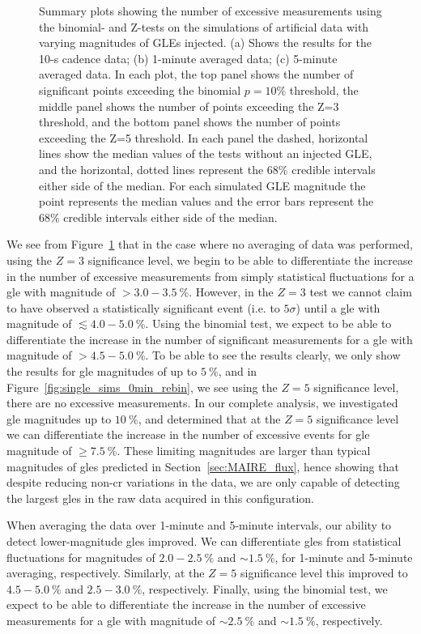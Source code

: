 \begin{figure}[!htbp!]
	\caption{Summary plots showing the number of excessive measurements using the binomial- and Z-tests on the simulations of artificial data with varying magnitudes of GLEs injected. (a) Shows the results for the 10-s cadence data; (b) 1-minute averaged data; (c) 5-minute averaged data. In each plot, the top panel shows the number of significant points exceeding the binomial $p = 10 \%$ threshold, the middle panel shows the number of points exceeding the Z=3 threshold, and the bottom panel shows the number of points exceeding the Z=5 threshold. In each panel the dashed, horizontal lines show the median values of the tests without an injected GLE, and the horizontal, dotted lines represent the $68 \%$ credible intervals either side of the median. For each simulated GLE magnitude the point represents the median values and the error bars represent the $68 \%$ credible intervals either side of the median.}
	\label{fig:single_HS14008_sims}
\end{figure}

We see from Figure~\ref{fig:single_HS14008_sims} that in the case where no averaging of data was performed, using the $Z=3$ significance level, we begin to be able to differentiate the increase in the number of excessive measurements from simply statistical fluctuations for a \gls{gle} with magnitude of $>3.0-3.5~\%$. However, in the $Z=3$ test we cannot claim to have observed a statistically significant event (i.e. to $5\sigma$) until a \gls{gle} with magnitude of $\lesssim4.0-5.0~\%$. Using the binomial test, we expect to be able to differentiate the increase in the number of significant measurements for a \gls{gle} with magnitude of $>4.5-5.0~\%$. To be able to see the results clearly, we only show the results for \gls{gle} magnitudes of up to $5~\%$, and in Figure~\ref{fig:single_sims_0min_rebin}, we see using the $Z=5$ significance level, there are no excessive measurements. In our complete analysis, we investigated \gls{gle} magnitudes up to $10~\%$, and determined that at the $Z=5$ significance level we can differentiate the increase in the number of excessive events for \gls{gle} magnitude of $\geq7.5~\%$. These limiting magnitudes are larger than typical magnitudes of \glspl{gle} predicted in Section~\ref{sec:MAIRE_flux}, hence showing that despite reducing non-\gls{cr} variations in the data, we are only capable of detecting the largest \glspl{gle} in the raw data acquired in this configuration.

When averaging the data over 1-minute and 5-minute intervals, our ability to detect lower-magnitude \glspl{gle} improved. We can differentiate \glspl{gle} from statistical fluctuations for magnitudes of $2.0-2.5~\%$ and $\sim1.5~\%$, for 1-minute and 5-minute averaging, respectively. Similarly, at the $Z=5$ significance level this improved to $4.5-5.0~\%$ and $2.5-3.0~\%$, respectively. Finally, using the binomial test, we expect to be able to differentiate the increase in the number of excessive measurements for a \gls{gle} with magnitude of $\sim2.5~\%$ and $\sim1.5~\%$, respectively.

